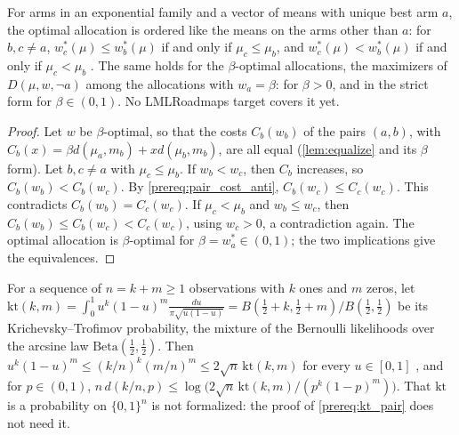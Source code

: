 \begin{theorem}
  \label{prereq:ordering}
  \leanok
  For arms in an exponential family and a vector of means with unique best arm $a$, the optimal
  allocation is ordered like the means on the arms other than $a$: for $b, c \ne a$,
  $w^*_c(\mu) \le w^*_b(\mu)$ if and only if $\mu_c \le \mu_b$, and $w^*_c(\mu) < w^*_b(\mu)$ if
  and only if $\mu_c < \mu_b$ \cite[Proposition 6]{GK16}. The same holds for the $\beta$-optimal
  allocations, the maximizers of $D(\mu, w, \neg a)$ among the allocations with $w_a = \beta$: for
  $\beta > 0$, and in the strict form for $\beta \in (0, 1)$. No LMLRoadmaps target covers it yet.
\end{theorem}

\begin{proof}
  \leanok
  Let $w$ be $\beta$-optimal, so that the costs $C_b(w_b)$ of the pairs $(a, b)$, with
  $C_b(x) = \beta d(\mu_a, m_b) + x d(\mu_b, m_b)$, are all equal (\cref{lem:equalize} and its
  $\beta$ form). Let $b, c \ne a$ with $\mu_c \le \mu_b$. If $w_b < w_c$, then $C_b$ increases, so
  $C_b(w_b) < C_b(w_c)$. By \cref{prereq:pair_cost_anti}, $C_b(w_c) \le C_c(w_c)$. This
  contradicts $C_b(w_b) = C_c(w_c)$. If $\mu_c < \mu_b$ and $w_b \le w_c$, then
  $C_b(w_b) \le C_b(w_c) < C_c(w_c)$, using $w_c > 0$, a contradiction again. The optimal
  allocation is $\beta$-optimal for $\beta = w^*_a \in (0, 1)$; the two implications give the
  equivalences.
\end{proof}

\begin{lemma}
  \label{prereq:kt}
  \leanok
  For a sequence of $n = k + m \ge 1$ observations with $k$ ones and $m$ zeros, let
  $\mathrm{kt}(k, m) = \int_0^1 u^k (1-u)^m \frac{du}{\pi\sqrt{u(1-u)}}
  = B(\tfrac12 + k, \tfrac12 + m) / B(\tfrac12, \tfrac12)$ be its Krichevsky--Trofimov
  probability, the mixture of the Bernoulli likelihoods over the arcsine law
  $\mathrm{Beta}(\tfrac12, \tfrac12)$. Then $u^k (1-u)^m \le (k/n)^k (m/n)^m \le 2\sqrt n\,
  \mathrm{kt}(k, m)$ for every $u \in [0, 1]$ \cite[Lemma 11]{GK16}, and for $p \in (0, 1)$,
  $n\, d(k/n, p) \le \log\bigl(2\sqrt n\, \mathrm{kt}(k, m) / (p^k (1-p)^m)\bigr)$. That
  $\mathrm{kt}$ is a probability on $\{0, 1\}^n$ is not formalized: the proof of
  \cref{prereq:kt_pair} does not need it.
\end{lemma}

